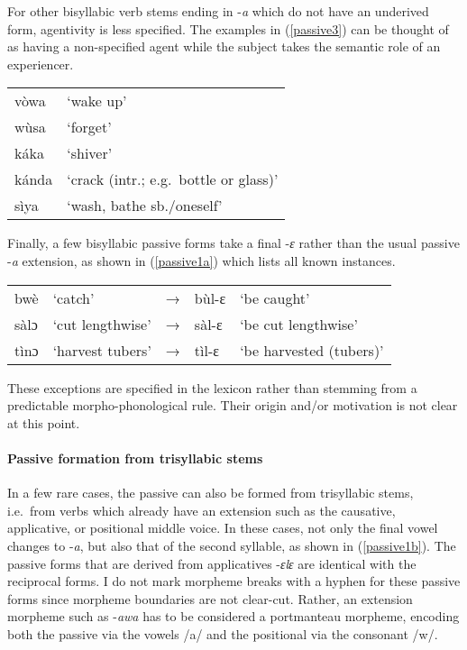 For other bisyllabic verb stems ending in -{\itshape a} which do not have an underived form, agentivity is less specified. The examples in  (\ref{passive3}) can be thought of as having a non-specified agent while the subject takes the semantic role of an experiencer.


\begin{exe} \ex \label{passive3}
\begin{tabular}{ll}
vòwa & `wake up'  \\
wùsa & `forget'  \\
káka & `shiver'  \\
kánda & `crack (intr.; e.g.\ bottle or glass)' \\
sìya & `wash, bathe sb./oneself'  \\
\end{tabular}
\end{exe}

Finally, a few bisyllabic passive forms take a final -{\itshape ɛ} rather than the usual passive -{\itshape a} extension, as shown in (\ref{passive1a}) which lists all known instances. 

\begin{exe} \ex \label{passive1a}
\begin{tabular}{lllll}
bwè & `catch' & → & bùl-ɛ & `be caught' \\
sàlɔ & `cut lengthwise' & → & sàl-ɛ & `be cut lengthwise' \\
tìnɔ & `harvest tubers' & → & tìl-ɛ & `be harvested (tubers)' \\
\end{tabular}
\end{exe} 

\noindent These exceptions are specified in the lexicon rather than stemming from a predictable morpho-phonological rule. Their origin and/or motivation is not clear at this point.


\paragraph{Passive formation from trisyllabic stems} In a few rare cases, the passive can also be formed from trisyllabic stems, i.e.\ from verbs which already have an extension such as the causative, applicative, or positional middle voice. In these cases, not only the final vowel changes to -{\itshape a}, but also that of the second syllable, as shown in (\ref{passive1b}). The passive forms that are derived from applicatives -{\itshape ɛlɛ} are identical with the reciprocal forms. I do not mark morpheme breaks with a hyphen for these passive forms since morpheme boundaries are not clear-cut. Rather, an extension morpheme such as -{\itshape awa} has to be considered a portmanteau morpheme, encoding both the passive via the vowels /a/ and the positional via the consonant /w/. 

